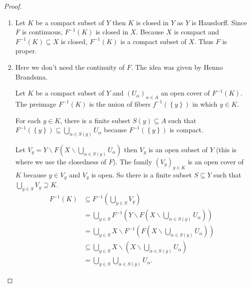 \begin{proof}
    \begin{enumerate}[itemsep=0pt,label={(\alph*)}]
        \item Let \( K \) be a compact subset of \( Y \) then \( K \) is closed in \( Y \) as \( Y \) is Hausdorff. Since \( F \) is continuous, \( F^{-1}(K) \) is closed in \( X \). Because \( X \) is compact and \( F^{-1}(K) \subseteq X \) is closed, \( F^{-1}(K) \) is a compact subset of \( X \). Thus \( F \) is proper.
        \item Here we don't need the continuity of \( F \). The idea was given by Henno Brandsma.

              Let \( K \) be a compact subset of \( Y \) and \( {(U_{\alpha})}_{\alpha \in A} \) an open cover of \( F^{-1}(K) \). The preimage \( F^{-1}(K) \) is the union of fibers \( f^{-1}(\left\{ y \right\}) \) in which \( y \in K \).

              For each \( y \in K \), there is a finite subset \( S(y) \subseteq A \) such that \( F^{-1}(\left\{ y \right\}) \subseteq \bigcup_{\alpha \in S(y)} U_{\alpha} \) because \( F^{-1}(\left\{ y \right\}) \) is compact.

              Let \( V_{y} = Y \smallsetminus F\left( X \smallsetminus \bigcup_{\alpha \in S(y)} U_{\alpha} \right) \) then \( V_{y} \) is an open subset of \( Y \) (this is where we use the closedness of \( F \)). The family \( {(V_{y})}_{y\in K} \) is an open cover of \( K \) because \( y \in V_{y} \) and \( V_{y} \) is open. So there is a finite subset \( S \subseteq Y \) such that \( \bigcup_{y \in S} V_{y} \supseteq K \).
              \begingroup
              \allowdisplaybreaks%
              \begin{align*}
                  F^{-1}(K) & \subseteq F^{-1}\left( \bigcup_{y \in S} V_{y} \right)                                                                          \\
                            & = \bigcup_{y\in S} F^{-1}\left( Y \smallsetminus F\left( X \smallsetminus \bigcup_{\alpha \in S(y)} U_{\alpha} \right) \right)  \\
                            & = \bigcup_{y \in S} X \smallsetminus F^{-1}\left( F\left( X \smallsetminus \bigcup_{\alpha \in S(y)} U_{\alpha} \right) \right) \\
                            & \subseteq \bigcup_{y\in S} X \smallsetminus (X \smallsetminus \bigcup_{\alpha \in S(y)} U_{\alpha})                             \\
                            & = \bigcup_{y \in S} \bigcup_{\alpha \in S(y)} U_{\alpha}.
              \end{align*}
              \endgroup


\end{enumerate}
\end{proof}
